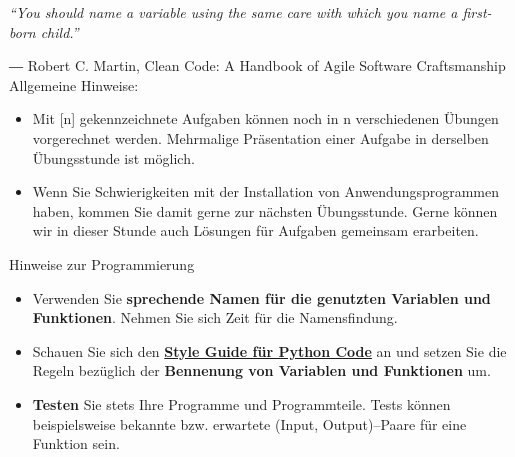 \documentclass[10pt]{scrartcl}
\begin{document}
\begin{center}
	\begin{minipage}{0.8\textwidth}
		\textit{“You should name a variable using the same care with which you name a first-born child.”} 
		
		{\color{darkgray}
			― Robert C. Martin, Clean Code: A Handbook of Agile Software Craftsmanship 
		}
		\vspace{.5cm} \\
		
		Allgemeine Hinweise:
		\begin{itemize}
			\item Mit [n] gekennzeichnete Aufgaben können noch in n verschiedenen Übungen vorgerechnet werden. Mehrmalige Präsentation einer Aufgabe in derselben Übungsstunde ist möglich.
			\item Wenn Sie Schwierigkeiten mit der Installation von Anwendungsprogrammen haben, kommen Sie damit gerne zur nächsten Übungsstunde. Gerne können wir in dieser Stunde auch Lösungen für Aufgaben gemeinsam erarbeiten.
		\end{itemize}
		Hinweise zur Programmierung
		\begin{itemize}
			\item Verwenden Sie \textbf{sprechende Namen für die genutzten Variablen und Funktionen}. Nehmen Sie sich Zeit für die Namensfindung.
			\item Schauen Sie sich den  \href{https://peps.python.org/pep-0008/#function-and-variable-names}{\textbf{Style Guide für Python Code}} an und setzen Sie die Regeln bezüglich der \textbf{Bennenung von Variablen und Funktionen} um.
			\item \textbf{Testen} Sie stets Ihre Programme und Programmteile. Tests können beispielsweise bekannte bzw. erwartete (Input, Output)--Paare für eine Funktion sein.
		\end{itemize}
	\end{minipage}
\end{center}


\vspace*{1cm}~\\
\begin{center}
	\Large
	
\end{center}

\newpage
\setcounter{page}{1}

\end{document}
